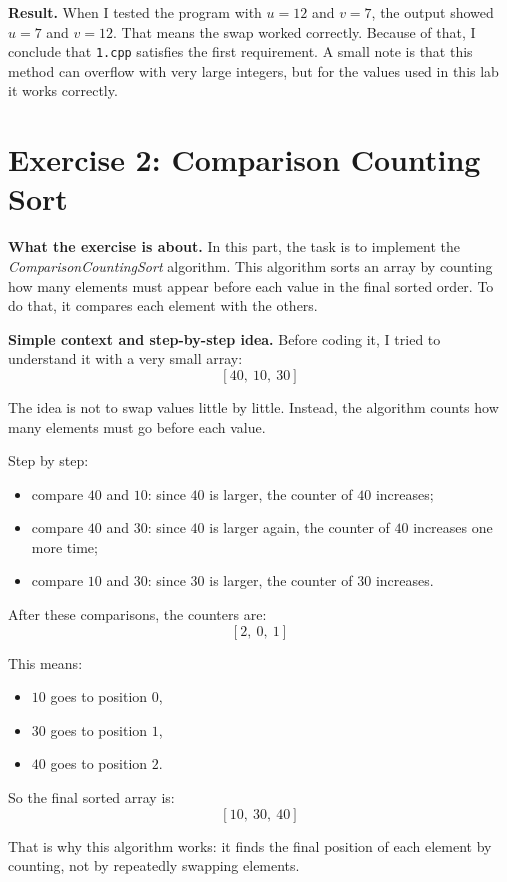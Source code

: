 \documentclass[12pt,a4paper]{article}
\begin{document}
\textbf{Result.} When I tested the program with \(u = 12\) and \(v = 7\), the output showed \(u = 7\) and \(v = 12\). That means the swap worked correctly. Because of that, I conclude that \texttt{1.cpp} satisfies the first requirement. A small note is that this method can overflow with very large integers, but for the values used in this lab it works correctly.

\section*{Exercise 2: Comparison Counting Sort}
\textbf{What the exercise is about.} In this part, the task is to implement the \textit{ComparisonCountingSort} algorithm. This algorithm sorts an array by counting how many elements must appear before each value in the final sorted order. To do that, it compares each element with the others.

\textbf{Simple context and step-by-step idea.} Before coding it, I tried to understand it with a very small array:
\[
[40,\ 10,\ 30]
\]

The idea is not to swap values little by little. Instead, the algorithm counts how many elements must go before each value.

Step by step:
\begin{itemize}
\item compare \(40\) and \(10\): since \(40\) is larger, the counter of \(40\) increases;
\item compare \(40\) and \(30\): since \(40\) is larger again, the counter of \(40\) increases one more time;
\item compare \(10\) and \(30\): since \(30\) is larger, the counter of \(30\) increases.
\end{itemize}

After these comparisons, the counters are:
\[
[2,\ 0,\ 1]
\]

This means:
\begin{itemize}
\item \(10\) goes to position \(0\),
\item \(30\) goes to position \(1\),
\item \(40\) goes to position \(2\).
\end{itemize}

So the final sorted array is:
\[
[10,\ 30,\ 40]
\]

That is why this algorithm works: it finds the final position of each element by counting, not by repeatedly swapping elements.
\end{document}
